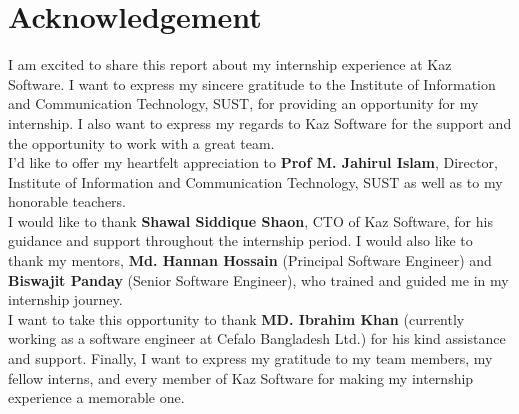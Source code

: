 \chapter*{Acknowledgement}

I am excited to share this report about my internship experience at Kaz Software.
I want to express my sincere gratitude to the Institute of Information and Communication Technology, SUST, for providing an opportunity for my internship.
I also want to express my regards to Kaz Software for the support and the opportunity to work with a great team.\\

I'd like to offer my heartfelt appreciation to \textbf{Prof M. Jahirul Islam}, Director, Institute of Information and Communication Technology, SUST as well as to my honorable teachers.\\

I would like to thank \textbf{Shawal Siddique Shaon}, CTO of Kaz Software, for his guidance and support throughout the internship period.
I would also like to thank my mentors, \textbf{Md. Hannan Hossain} (Principal Software Engineer) and \textbf{Biswajit Panday} (Senior Software Engineer), who trained and guided me in my internship journey.\\

I want to take this opportunity to thank \textbf{MD. Ibrahim Khan} (currently working as a software engineer at Cefalo Bangladesh Ltd.) for his kind assistance and support.
Finally, I want to express my gratitude to my team members, my fellow interns, and every member of Kaz Software for making my internship experience a memorable one.